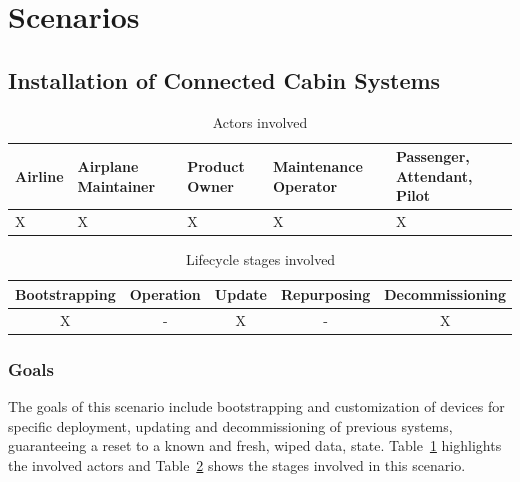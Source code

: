\section{Scenarios}

\subsection{Installation of Connected Cabin Systems} %
\label{sub:Installation of Connected Cabin Systems}

\begin{table}
	\caption{Actors involved}
	\label{tab:Actors involved}
	\begin{center}
		\begin{tabular}{ |p{2.5cm}|p{2.5cm}|p{2.5cm}|p{2.5cm}|p{2.5cm}| }
			\hline
			Airline & Airplane Maintainer & Product Owner & Maintenance Operator & Passenger, Attendant, Pilot \\
			\hline
			X       & X                   & X             & X                    & X                           \\
			\hline
		\end{tabular}
	\end{center}
\end{table}

\begin{table}
	\caption{Lifecycle stages involved}
	\label{tab:Lifecycle stages involved}
	\begin{center}
		\begin{tabular}{ |c|c|c|c|c| }
			\hline
			Bootstrapping & Operation & Update & Repurposing & Decommissioning \\
			\hline
			X             & -         & X      & -           & X               \\
			\hline
		\end{tabular}
	\end{center}
\end{table}


\subsubsection{Goals}

The goals of this scenario include bootstrapping and customization of devices for specific deployment, updating and
decommissioning of previous systems, guaranteeing a reset to a known and fresh, wiped data, state.
Table~\ref{tab:Actors involved} highlights the involved actors and Table~\ref{tab:Lifecycle stages involved} shows the
stages involved in this scenario.

